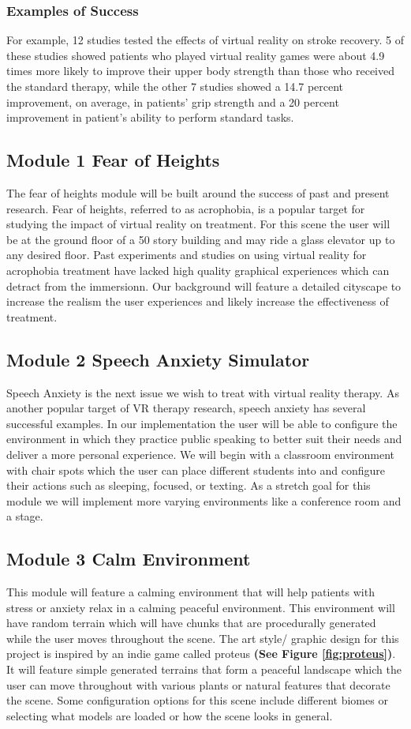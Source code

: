 \documentclass[a4paper,10pt]{article}
\begin{document}
\subsubsection{Examples of Success}
For example, 12 studies tested the effects of virtual reality on stroke recovery. 5 of these studies showed patients who played virtual reality games were about 4.9 times more likely to improve their upper body strength than those who received the standard therapy, while the other 7  studies showed a 14.7 percent improvement, on average, in patients' grip strength and a 20 percent improvement in patient's ability to perform standard tasks.\cite{stroke1}
\pagebreak
\subsection{Module 1 Fear of Heights}
The fear of heights module will be built around the success of past and present research. Fear of heights, referred to as acrophobia, is a popular target for studying the impact of virtual reality on treatment. For this scene the user will be at the ground floor of a 50 story building and may ride a glass elevator up to any desired floor. Past experiments and studies on using virtual reality for acrophobia treatment have lacked high quality graphical experiences which can detract from the immersionn. Our background will feature a detailed cityscape to increase the realism the user experiences and likely increase the effectiveness of treatment.
\pagebreak
\subsection{Module 2 Speech Anxiety Simulator}
Speech Anxiety is the next issue we wish to treat with virtual reality therapy. As another popular target of VR therapy research, speech anxiety has several successful examples. In our implementation the user will be able to configure the environment in which they practice public speaking to better suit their needs and deliver a more personal experience. We will begin with a classroom environment with chair spots which the user can place different students into and configure their actions such as sleeping, focused, or texting. As a stretch goal for this module we will implement more varying environments like a conference room and a stage.
\pagebreak
\subsection{Module 3 Calm Environment} %
This module will feature a calming environment that will help patients with stress or anxiety relax in a calming peaceful environment. This environment will have random terrain which will have chunks 
that are procedurally generated while the user moves throughout the scene.  The art style/ graphic design for this project is inspired by an indie game called proteus \textbf{(See Figure \ref{fig:proteus})}. 
It will feature simple generated terrains that form a  peaceful landscape which the user can move throughout with various plants or natural features that decorate the scene. 
Some configuration options for this scene include different biomes or selecting what models are loaded or how the scene looks in general. 
\end{document}
